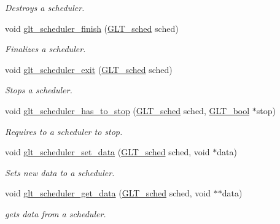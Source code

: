 \begin{DoxyCompactItemize}
\begin{DoxyCompactList}\small\item\em Destroys a scheduler. \end{DoxyCompactList}\item 
void \hyperlink{group__SCHED_ga04724f9b33887333c478744fa2714b3c}{glt\-\_\-scheduler\-\_\-finish} (\hyperlink{group__OBJECTS_gab02c120fc3e930ea3d1da65a21eaa6d6}{G\-L\-T\-\_\-sched} sched)
\begin{DoxyCompactList}\small\item\em Finalizes a scheduler. \end{DoxyCompactList}\item 
void \hyperlink{group__SCHED_ga8df21c40ca28bf29f55cb64ecd077aa7}{glt\-\_\-scheduler\-\_\-exit} (\hyperlink{group__OBJECTS_gab02c120fc3e930ea3d1da65a21eaa6d6}{G\-L\-T\-\_\-sched} sched)
\begin{DoxyCompactList}\small\item\em Stops a scheduler. \end{DoxyCompactList}\item 
void \hyperlink{group__SCHED_ga526550e59b800d931c26248d8369d950}{glt\-\_\-scheduler\-\_\-has\-\_\-to\-\_\-stop} (\hyperlink{group__OBJECTS_gab02c120fc3e930ea3d1da65a21eaa6d6}{G\-L\-T\-\_\-sched} sched, \hyperlink{group__OBJECTS_ga64121a8c1742a545436e128bcbfd6131}{G\-L\-T\-\_\-bool} $\ast$stop)
\begin{DoxyCompactList}\small\item\em Requires to a scheduler to stop. \end{DoxyCompactList}\item 
void \hyperlink{group__SCHED_ga44dff47dabe465b54837723b50b6da71}{glt\-\_\-scheduler\-\_\-set\-\_\-data} (\hyperlink{group__OBJECTS_gab02c120fc3e930ea3d1da65a21eaa6d6}{G\-L\-T\-\_\-sched} sched, void $\ast$data)
\begin{DoxyCompactList}\small\item\em Sets new data to a scheduler. \end{DoxyCompactList}\item 
void \hyperlink{group__SCHED_ga1ac411aa00d4a35211ffad154a6cf875}{glt\-\_\-scheduler\-\_\-get\-\_\-data} (\hyperlink{group__OBJECTS_gab02c120fc3e930ea3d1da65a21eaa6d6}{G\-L\-T\-\_\-sched} sched, void $\ast$$\ast$data)
\begin{DoxyCompactList}\small\item\em gets data from a scheduler. \end{DoxyCompactList}\item 
$$
\end{DoxyCompactItemize}
